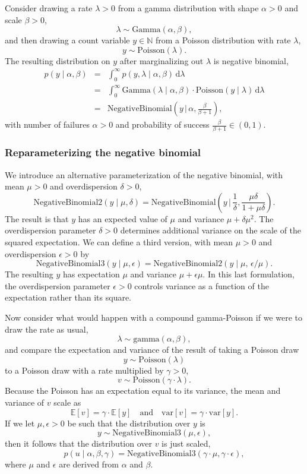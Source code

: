 \documentclass[11pt]{report}
\begin{document}
Consider drawing a rate $\lambda > 0$ from a gamma distribution with
shape $\alpha > 0$ and scale $\beta > 0$,
%
\[
  \lambda \sim \textrm{Gamma}(\alpha, \beta),
\]
%
and then drawing a count variable $y \in \mathbb{N}$ from a Poisson
distribution with rate $\lambda$,
%
\[
  y \sim \textrm{Poisson}(\lambda).
\]
%
The resulting distribution on $y$ after marginalizing out $\lambda$ is
negative binomial,
%
\begin{eqnarray*}
  p(y \mid \alpha, \beta)
  & = & \int_0^{\infty} p(y, \lambda \mid \alpha, \beta) \, \textrm{d}\lambda
  \\[3pt]
  & = & \int_0^{\infty} \textrm{Gamma}(\lambda \mid \alpha, \beta)
        \cdot \textrm{Poisson}(y \mid \lambda) \, \textrm{d}\lambda
  \\[3pt]
  & = &  \textrm{NegativeBinomial}\left(y \,\bigg|\,
        \alpha, \frac{\beta}{\beta + 1} \right),
\end{eqnarray*}
%
with number of failures $\alpha > 0$ and probability of success
$\frac{\beta}{\beta + 1} \in (0, 1)$.


\subsubsection{Reparameterizing the negative binomial}

We introduce an alternative parameterization of the negative binomial,
with mean $\mu > 0$ and overdispersion $\delta > 0$,
%
\[
  \textrm{NegativeBinomial2}(y \mid \mu, \delta)
  =
  \textrm{NegativeBinomial}\left(y \,\big|\, \frac{1}{\delta}, \frac{\mu \delta}{1 + \mu \delta}\right).
\]
%
The result is that $y$ has an expected value of $\mu$ and variance $\mu + \delta \mu^2$.
The overdispersion parameter $\delta > 0$ determines additional
variance on the scale of the squared expectation.  We can define a
third version, with mean $\mu > 0$ and overdispersion $\epsilon > 0$
by
%
\[
  \textrm{NegativeBinomial3}(y \mid \mu, \epsilon)
  =
  \textrm{NegativeBinomial2}(y \mid \mu, \, \epsilon / \mu).
\]
%
The resulting $y$ has expectation $\mu$ and variance $\mu + \epsilon
\mu$.  In this last formulation, the overdispersion parameter
$\epsilon > 0$ controls variance as a function of the expectation
rather than its square.

Now consider what would happen with a compound gamma-Poisson if we
were to draw the rate as usual,
\[
  \lambda \sim \textrm{gamma}(\alpha, \beta),
\]
and compare the expectation and variance of the result of taking a
Poisson draw
\[
  y \sim \textrm{Poisson}(\lambda)
\]
to a Poisson draw with a rate multiplied by $\gamma > 0$,
\[
  v \sim \textrm{Poisson}(\gamma \cdot \lambda).
\]
Because the Poisson has an expectation equal to its variance, the mean
and variance of $v$ scale as
\[
  \mathbb{E}[v] = \gamma \cdot \mathbb{E}[y]
  \quad \textrm{and} \quad
  \textrm{var}[v] = \gamma \cdot \textrm{var}[y].
\]
If we let $\mu, \epsilon > 0$ be such that the distribution over $y$
is
\[
  y \sim \textrm{NegativeBinomial3}(\mu, \epsilon),
\]
then it follows that the distribution over $v$ is just scaled,
\[
  p(u \mid \alpha, \beta, \gamma)
  = \textrm{NegativeBinomial3}(\gamma \cdot \mu, \gamma \cdot \epsilon),
\]
where $\mu$ and $\epsilon$ are derived from $\alpha$ and $\beta$.
\end{document}
